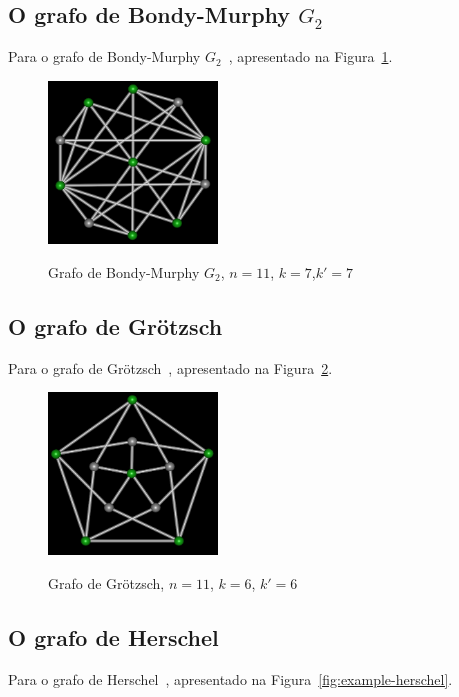 \subsection{O grafo de Bondy-Murphy $G_2$}
Para o grafo de Bondy-Murphy $G_2$~\cite{cite:example-bondy},
apresentado na Figura~\ref{fig:example-bondymurphyg2}.

\begin{figure}[htb]
\centering
\includegraphics[width=0.4\textwidth]{img/bondymurphyg2.png}
\label{fig:example-bondymurphyg2}
\caption{Grafo de Bondy-Murphy $G_2$, $n=11$, $k=7$,$k'=7$}
\end{figure}


\subsection{O grafo de Grötzsch}
Para o grafo de Grötzsch~\cite{cite:example-grotzsch},
apresentado na Figura~\ref{fig:example-grotzsch}.

\begin{figure}[htb]
\centering
\includegraphics[width=0.4\textwidth]{img/grotzsch.png}
\label{fig:example-grotzsch}
\caption{Grafo de Grötzsch, $n=11$, $k=6$, $k'=6$}
\end{figure}


\subsection{O grafo de Herschel}
Para o grafo de Herschel~\cite{cite:example-herschel},
apresentado na Figura~\ref{fig:example-herschel}.

